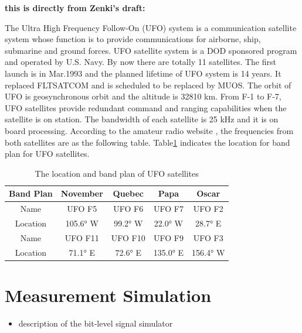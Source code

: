\documentclass[draftcls,onecolumn]{IEEEtran}  %
\begin{document}
   \bf this is directly from Zenki's draft: \rm 
   
   The Ultra High Frequency Follow-On (UFO) system is a communication satellite system whose function is to provide communications for airborne, ship, submarine and ground forces. UFO satellite system is a DOD sponsored program and operated by U.S. Navy. By now there are totally 11 satellites. The first launch is in Mar.1993 and the planned lifetime of UFO system is 14 years. It replaced FLTSATCOM and is scheduled to be replaced by MUOS. The orbit of UFO is geosynchronous orbit and the altitude is 32810 km. From F-1 to F-7, UFO satellites provide redundant command and ranging capabilities when the satellite is on station. The bandwidth of each satellite is 25 kHz and it is on board processing. According to the amateur radio website \cite{Matt:2014}, the frequencies from both satellites are as the following table. Table\ref{Table Band Plan} indicates the location for band plan for UFO satellites.

\begin{table}[ht]
\centering
\begin{tabular}  {|c|c|c|c|c|}
	\hline
     \textbf{Band Plan} & \textbf{November}	& \textbf{Quebec} &	\textbf{Papa} & \textbf{Oscar} \\
    \hline
    Name & UFO F5 & UFO F6 & UFO F7 & UFO F2 \\
    \hline
     Location &	105.6° W & 99.2° W & 	22.0° W	&  28.7° E\\
    \hline
    Name & UFO F11 & UFO F10 & UFO F9  & UFO F3 \\
    \hline
    Location& 71.1° E &	72.6° E &	135.0° E &	156.4° W \\
    \hline
\end{tabular}
\caption{The location and band plan of UFO satellites}
\label{Table Band Plan}
\end{table}


\section{Measurement Simulation}
   \begin{itemize}
     \item description of the bit-level signal simulator
   \end{itemize}
   
\end{document}
